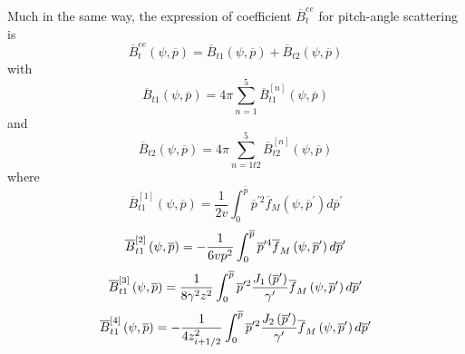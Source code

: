 Much in the same way, the expression of coefficient $\overline{B}_{t}^{ee}$
for pitch-angle scattering is
\begin{equation}
\overline{B}_{t}^{ee}\left( \psi ,\overline{p}\right) =\overline{B}%
_{t1}\left( \psi ,\overline{p}\right) +\overline{B}_{t2}\left( \psi ,%
\overline{p}\right)
\end{equation}
with
\begin{equation}
\overline{B}_{t1}\left( \psi ,\overline{p}\right) =4\pi \sum_{n=1}^{5}%
\overline{B}_{t1}^{\left[ n\right] }\left( \psi ,\overline{p}\right)
\end{equation}
and
\begin{equation}
\overline{B}_{t2}\left( \psi ,\overline{p}\right) =4\pi \sum_{n=1t2}^{5}%
\overline{B}_{t2}^{\left[ n\right] }\left( \psi ,\overline{p}\right)
\end{equation}
where
\begin{equation}
\overline{B}_{t1}^{\left[ 1\right] }\left( \psi ,\overline{p}\right) =\frac{1%
}{2v}\int_{0}^{\overline{p}}\overline{p}^{\prime 2}\overline{f}_{M}\left(
\psi ,\overline{p}^{\prime }\right) d\overline{p}^{\prime }
\end{equation}
\begin{equation}
\overline{B}_{t1}^{\left[ 2\right] }\left( \psi ,\overline{p}\right) =-\frac{%
1}{6vp^{2}}\int_{0}^{\overline{p}}\overline{p}^{\prime 4}\overline{f}%
_{M}\left( \psi ,\overline{p}^{\prime }\right) d\overline{p}^{\prime }
\end{equation}
\begin{equation}
\overline{B}_{t1}^{\left[ 3\right] }\left( \psi ,\overline{p}\right) =\frac{1%
}{8\gamma ^{2}z^{2}}\int_{0}^{\overline{p}}\overline{p}^{\prime 2}\frac{%
J_{1}\left( \overline{p}^{\prime }\right) }{\gamma ^{\prime }}\overline{f}
_{M}\left( \psi ,\overline{p}^{\prime }\right) d\overline{p}^{\prime }
\end{equation}
\begin{equation}
\overline{B}_{t1}^{\left[ 4\right] }\left( \psi ,\overline{p}\right) =-\frac{%
1}{4z_{i+1/2}^{2}}\int_{0}^{\overline{p}}\overline{p}^{\prime 2}\frac{%
J_{2}\left( \overline{p}^{\prime }\right) }{\gamma ^{\prime }}\overline{f}%
_{M}\left( \psi ,\overline{p}^{\prime }\right) d\overline{p}^{\prime }
\end{equation}

